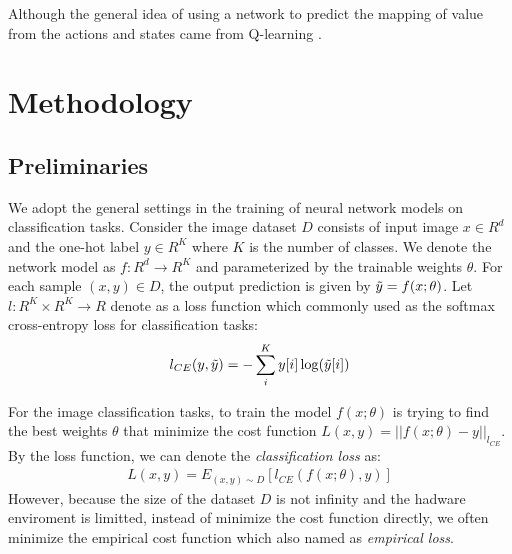 \documentclass[english]{sobraep}
\newcommand{\wahib}[1] {{\color{blue}}{\color{blue}{#1}}}
\begin{document}
Although the general idea of using a network to predict the mapping of value from the actions and states came from Q-learning \cite{watkins1992q,mnih2015human}. \wahib{We make use of this dynamic programming idea by treating the loss surface as the environments and treating the test losses as the costs or rewards.}



\section{Methodology}
\wahib{In this section, we introduce the general settings of training neural network models, and then propose a new regularization algorithm based on the prediction of the validation loss surface.}

\subsection{Preliminaries}

We adopt the general settings in the training of neural network models on classification tasks. 
Consider the image dataset $D$ consists of input image $x \in R^d$ and the one-hot label $y \in R^K$ where $K$ is the number of classes. We denote the network model as $f:R^d \xrightarrow{} R^K$ and parameterized by the trainable weights $\theta$. For each sample $(x,y) \in D$, the output prediction is given by $\Tilde{y} = f(x; \theta)$. Let $l:R^K \times R^K \xrightarrow{} R$ denote as a loss function which commonly used as the softmax cross-entropy loss for classification tasks:
\begin{align}
    l_{CE}(y,\Tilde{y}) = - \sum^{K}_{i}{y[i]\log(\Tilde{y}[i])}
\end{align}

For the image classification tasks, to train the model $f(x;\theta)$ is trying to find the best weights $\theta$ that minimize the cost function $L(x,y) = ||f(x;\theta) - y||_{l_{CE}}$. By the loss function, we can denote the \textit{classification loss} as:
\begin{align}
L(x,y) = E_{(x,y) \sim D}[l_{CE}(f(x;\theta),y)]
\end{align}
However, because the size of the dataset $D$ is not infinity and the hadware enviroment is limitted, instead of minimize the cost function directly, we often minimize the empirical cost function which also named as \textit{empirical loss}.
\end{document}
